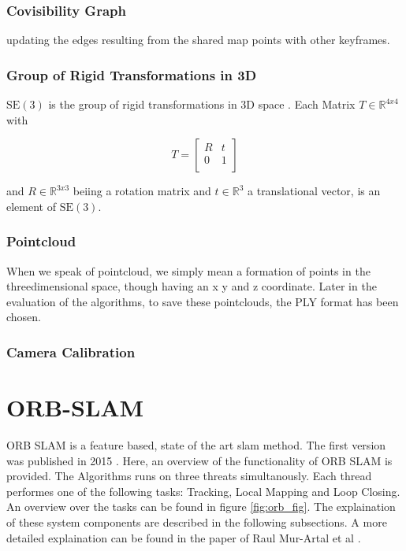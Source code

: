 		\subsubsection{Covisibility Graph}
		
		updating the edges resulting from the shared map
		points with other keyframes.
		
		\subsubsection{Group of Rigid Transformations in 3D}
		
		$\text{SE}(3)$ is the group of rigid transformations in 3D space \cite{se3}. Each Matrix $ T \in \mathbb{R}^{4x4}$ with 
		
		$$ T = \left[
		\begin{array}{rrr}
		R &  t \\  
		0  & 1 \\ 
		\end{array} \right]$$
		
		and $ R \in \mathbb{R}^{3x3}$ beiing a rotation matrix and $ t \in \mathbb{R}^{3}$ a translational vector, is an element of $\text{SE}(3)$.
		
		
		\subsubsection{Pointcloud}
		
		When we speak of pointcloud, we simply mean a formation of points in the threedimensional space, though having
		an x y and z coordinate. Later in the evaluation of the algorithms, to save these pointclouds, the PLY format has 
		been chosen. 
		
		\subsubsection{Camera Calibration}

	\section{ORB-SLAM}
	
	ORB SLAM is a feature based, state of the art slam method. The first version was published in 2015 \cite{orb}. 
	Here, an overview of the functionality of ORB SLAM is provided. The Algorithms runs on three threats simultanously.
	Each thread performes one of the following tasks: Tracking, Local Mapping and Loop Closing. An overview over the tasks can be found 
	in figure \ref{fig:orb_fig}. The explaination of these system components are described in the following subsections. 
	A more detailed explaination can be found in the paper of Raul Mur-Artal et al \cite{orb}.
	
